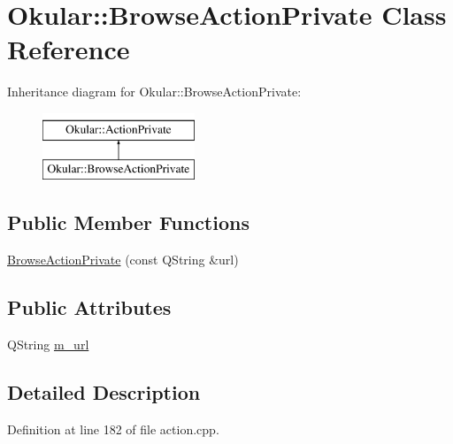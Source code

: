 \hypertarget{classOkular_1_1BrowseActionPrivate}{\section{Okular\+:\+:Browse\+Action\+Private Class Reference}
\label{classOkular_1_1BrowseActionPrivate}
}
Inheritance diagram for Okular\+:\+:Browse\+Action\+Private\+:\begin{figure}[H]
\begin{center}
\leavevmode
\includegraphics[height=2.000000cm]{classOkular_1_1BrowseActionPrivate}
\end{center}
\end{figure}
\subsection*{Public Member Functions}
\begin{DoxyCompactItemize}
\item 
\hyperlink{classOkular_1_1BrowseActionPrivate_addf8c6ccf5739ebe6d60b524b2a3e11c}{Browse\+Action\+Private} (const Q\+String \&url)
\end{DoxyCompactItemize}
\subsection*{Public Attributes}
\begin{DoxyCompactItemize}
\item 
Q\+String \hyperlink{classOkular_1_1BrowseActionPrivate_aa216b4a85b5dc7bcb4a89e3553e7a001}{m\+\_\+url}
\end{DoxyCompactItemize}


\subsection{Detailed Description}


Definition at line 182 of file action.\+cpp.




